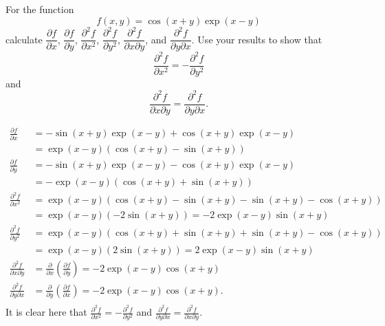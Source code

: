 
\setcounter{question}{0}
\question For the function 
\[ f(x, y) = \cos{(x + y)} \exp{(x - y)} \] 
calculate 
$\dfrac{\partial f}{\partial x}$, $\dfrac{\partial f}{\partial y}$, $\dfrac{\partial^2f}{\partial x^2}$, $\dfrac{\partial^2f}{\partial y^2}$, 
$\dfrac{\partial^2f}{\partial x\partial y}$, 
and $\dfrac{\partial^2f}{\partial y\partial x}$. 
Use your results to show that 
\[ \dfrac{\partial^2f}{\partial x^2} = -\dfrac{\partial^2f}{\partial y^2} \] 
and 
\[ \dfrac{\partial^2 f}{\partial x\partial y} = \dfrac{\partial^2 f}{\partial y\partial x}. \]
\begin{solution}
    \begin{align*}
        \frac{\partial f}{\partial x} &= -\sin{(x + y)} \exp{(x - y)} + \cos{(x + y)} \exp{(x - y)} \\
        &= \exp{(x - y)} \left( \cos{(x + y)} - \sin{(x + y)} \right) \\
        \frac{\partial f}{\partial y} &= - \sin{(x + y)} \exp{(x - y)} - \cos{(x + y)} \exp{(x - y)} \\
        &= - \exp{(x - y)} \left( \cos{(x + y)} + \sin{(x + y)} \right) \\
        \frac{\partial^2 f}{\partial x^2} &= \exp{(x - y)} \left( \cos{(x + y)} - \sin{(x + y)} - \sin{(x + y)} - \cos{(x + y)} \right) \\
        &= \exp{(x - y)} \left( -2\sin{(x + y)} \right) = -2 \exp{(x - y)} \sin{(x + y)} \\
        \frac{\partial^2 f}{\partial y^2} &= \exp{(x - y)} \left( \cos{(x + y)} + \sin{(x + y)} + \sin{(x + y)} - \cos{(x + y)} \right) \\
        &= \exp{(x - y)} \left( 2\sin{(x + y)} \right) = 2 \exp{(x - y)} \sin{(x + y)} \\
        \frac{\partial^2 f}{\partial x \partial y} &= \frac{\partial}{\partial x} \left( \frac{\partial f}{\partial y} \right) = -2\exp{(x - y)}\cos{(x + y)} \\
        \frac{\partial^2 f}{\partial y \partial x} &= \frac{\partial}{\partial y} \left( \frac{\partial f}{\partial x} \right) = -2 \exp{(x - y)} \cos{(x + y)}. \\
    \end{align*}
    It is clear here that $\frac{\partial^2 f}{\partial x^2} = -\frac{\partial^2 f}{\partial y^2}$ and $\frac{\partial^2 f}{\partial y \partial x} = \frac{\partial^2 f}{\partial x \partial y}$.
\end{solution}

